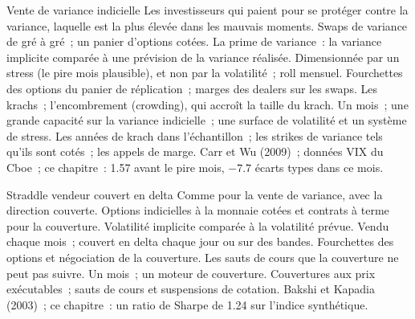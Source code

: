\begin{strategyfile}{Vente de variance indicielle}\label{strat:s2:harvesting-the-variance-risk-premium:variance}
 Les investisseurs qui paient pour se protéger contre la variance, laquelle est la plus élevée dans les mauvais moments.
 Swaps de variance de gré à gré~; un panier d'options cotées.
 La prime de variance~: la variance implicite comparée à une prévision de la variance réalisée.
 Dimensionnée par un stress (le pire mois plausible), et non par la volatilité~; roll mensuel.
 Fourchettes des options du panier de réplication~; marges des dealers sur les swaps.
 Les krachs~; l'encombrement (crowding), qui accroît la taille du krach.
 Un mois~; une grande capacité sur la variance indicielle~; une surface de volatilité et un système de stress.
 Les années de krach dans l'échantillon~; les strikes de variance tels qu'ils sont cotés~; les appels de marge.
 Carr et Wu (2009)~; données VIX du Cboe~; ce chapitre~: 1.57 avant le pire mois, $-7.7$ écarts types dans ce mois.
\end{strategyfile}

\begin{strategyfile}{Straddle vendeur couvert en delta}\label{strat:s2:harvesting-the-variance-risk-premium:straddle}
 Comme pour la vente de variance, avec la direction couverte.
 Options indicielles à la monnaie cotées et contrats à terme pour la couverture.
 Volatilité implicite comparée à la volatilité prévue.
 Vendu chaque mois~; couvert en delta chaque jour ou sur des bandes.
 Fourchettes des options et négociation de la couverture.
 Les sauts de cours que la couverture ne peut pas suivre.
 Un mois~; un moteur de couverture.
 Couvertures aux prix exécutables~; sauts de cours et suspensions de cotation.
 Bakshi et Kapadia (2003)~; ce chapitre~: un ratio de Sharpe de 1.24 sur l'indice synthétique.
\end{strategyfile}

